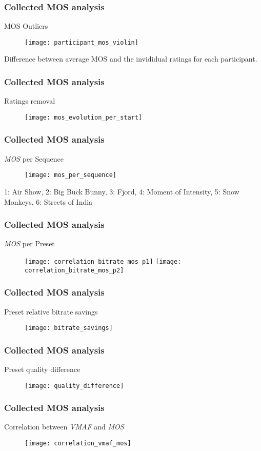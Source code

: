 \begin{frame}
	\frametitle{Collected MOS analysis}
	\large{MOS Outliers}
	\begin{figure}
		\centering
		\texttt{[image: participant\_mos\_violin]}
	\end{figure}

	Difference between average MOS and the invididual ratings for each participant.
\end{frame}

\begin{frame}
	\frametitle{Collected MOS analysis}
	\large{Ratings removal}
	\begin{figure}
		\centering
		\texttt{[image: mos\_evolution\_per\_start]}
	\end{figure}
\end{frame}

\begin{frame}
	\frametitle{Collected MOS analysis}
	\large{\textit{MOS} per Sequence}
	\begin{figure}
		\centering
		\texttt{[image: mos\_per\_sequence]}
	\end{figure}

	1: Air Show, 2: Big Buck Bunny, 3: Fjord, 4: Moment of Intensity, 5: Snow Monkeys, 6: Streets of India
\end{frame}

\begin{frame}
	\frametitle{Collected MOS analysis}
	\large{\textit{MOS} per Preset}
	\begin{figure}
		\centering
		\texttt{[image: correlation\_bitrate\_mos\_p1]}
		\texttt{[image: correlation\_bitrate\_mos\_p2]}
	\end{figure}
\end{frame}


\begin{frame}
	\frametitle{Collected MOS analysis}
	\large{Preset relative bitrate savings}
	\begin{figure}
		\centering
		\texttt{[image: bitrate\_savings]}
	\end{figure}
\end{frame}

\begin{frame}
	\frametitle{Collected MOS analysis}
	\large{Preset quality difference}
	\begin{figure}
		\centering
		\texttt{[image: quality\_difference]}
	\end{figure}
\end{frame}


\begin{frame}
	\frametitle{Collected MOS analysis}
	\large{Correlation between \textit{VMAF} and \textit{MOS}}

	\begin{figure}
		\centering
		\texttt{[image: correlation\_vmaf\_mos]}
	\end{figure}
\end{frame}